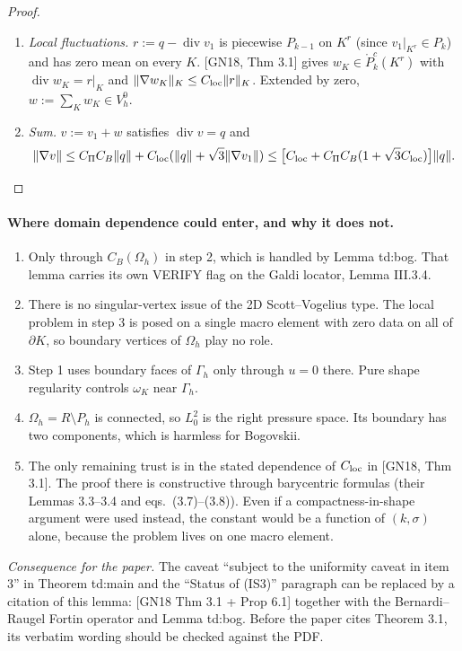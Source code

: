 \documentclass[11pt]{article}
\theoremstyle{remark}\newtheorem{remark}[theorem]{Remark}
\newcommand{\Oh}{\Omega_h}\newcommand{\Gh}{\Gamma_h}\newcommand{\hG}{h_\Gamma}\newcommand{\dn}{\partial_n}
\newcommand{\norm}[1]{\|#1\|}\newcommand{\ip}[2]{\langle #1,#2\rangle}\DeclareMathOperator{\curl}{curl}\DeclareMathOperator{\diam}{diam}
\begin{document}
\begin{proof}
\begin{enumerate}[label=\arabic*.]
\item \emph{Local fluctuations.} $r:=q-\operatorname{div}v_1$ is piecewise $P_{k-1}$ on $K^r$ (since $v_1|_{K^r}\in P_k$) and has zero mean on every $K$. [GN18, Thm 3.1] gives $w_K\in\mathring P^c_k(K^r)$ with $\operatorname{div}w_K=r|_K$ and $\norm{\nabla w_K}_K\le C_{\rm loc}\norm r_K$. Extended by zero, $w:=\sum_Kw_K\in V_h^0$.
\item \emph{Sum.} $v:=v_1+w$ satisfies $\operatorname{div}v=q$ and
 \[\norm{\nabla v}\le C_\Pi C_B\norm q+C_{\rm loc}(\norm q+\sqrt3\norm{\nabla v_1})\le\bigl[C_{\rm loc}+C_\Pi C_B(1+\sqrt3C_{\rm loc})\bigr]\norm q.\qedhere\]
\end{enumerate}
\end{proof}

\paragraph{Where domain dependence could enter, and why it does not.}
\begin{enumerate}[label=(\alph*)]
\item Only through $C_B(\Oh)$ in step 2, which is handled by Lemma td:bog. That lemma carries its own VERIFY flag on the Galdi locator, Lemma III.3.4.
\item There is no singular-vertex issue of the 2D Scott--Vogelius type. The local problem in step 3 is posed on a single macro element with zero data on all of $\partial K$, so boundary vertices of $\Oh$ play no role.
\item Step 1 uses boundary faces of $\Gh$ only through $u=0$ there. Pure shape regularity controls $\omega_K$ near $\Gh$.
\item $\Oh=R\setminus P_h$ is connected, so $L^2_0$ is the right pressure space. Its boundary has two components, which is harmless for Bogovskii.
\item The only remaining trust is in the stated dependence of $C_{\rm loc}$ in [GN18, Thm 3.1]. The proof there is constructive through barycentric formulas (their Lemmas 3.3--3.4 and eqs.\ (3.7)--(3.8)). Even if a compactness-in-shape argument were used instead, the constant would be a function of $(k,\sigma)$ alone, because the problem lives on one macro element.
\end{enumerate}
\emph{Consequence for the paper.} The caveat ``subject to the uniformity caveat in item 3'' in Theorem td:main and the ``Status of (IS3)'' paragraph can be replaced by a citation of this lemma: [GN18 Thm 3.1 + Prop 6.1] together with the Bernardi--Raugel Fortin operator and Lemma td:bog. Before the paper cites Theorem 3.1, its verbatim wording should be checked against the PDF.
\end{document}
